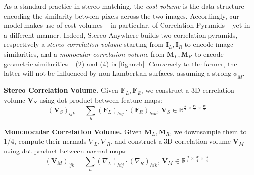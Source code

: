 \documentclass[10pt,twocolumn,letterpaper]{article}
\newcommand{\method}[0]{Stereo Anywhere\xspace}
\begin{document}
As a standard practice in stereo matching, the \textit{cost volume} is the data structure encoding the similarity between pixels across the two images. Accordingly, our model makes use of cost volumes -- in particular, of Correlation Pyramids \cite{lipson2021raft} -- yet in a different manner.
Indeed, \method builds two correlation pyramids, respectively a \textit{stereo correlation volume} starting from $\mathbf{I}_L, \mathbf{I}_R$ to encode image similarities, and a \textit{monocular correlation volume} from $\mathbf{M}_L, \mathbf{M}_R$ to encode geometric similarities -- (2) and (4) in \cref{fig:arch}.
Conversely to the former, the latter will not be influenced by non-Lambertian surfaces, assuming a strong $\phi_M$.

\textbf{Stereo Correlation Volume.} Given $\mathbf{F}_L, \mathbf{F}_R$, we construct a 3D correlation volume $\mathbf{V}_S$ using dot product between feature maps:
\begin{equation}
    (\mathbf{V}_S)_{ijk} = \sum_{h} (\mathbf{F}_L)_{hij} \cdot (\mathbf{F}_R)_{hik}, \ \mathbf{V}_S \in \mathbb{R}^{\frac{H}{4} \times \frac{W}{4} \times \frac{W}{4}}
    \label{eq:dot_corr}
\end{equation}

\textbf{Mononocular Correlation Volume.} Given $\mathbf{M}_L, \mathbf{M}_R$,
we downsample them to 1/4, compute their normals $\nabla_L, \nabla_R$,
and construct a 3D correlation volume $\mathbf{V}_M$ using dot product between normal maps:
\begin{equation}
    (\mathbf{V}_M)_{ijk} = \sum_{h} (\nabla_L)_{hij} \cdot (\nabla_R)_{hik}, \ \mathbf{V}_M \in \mathbb{R}^{\frac{H}{4} \times \frac{W}{4} \times \frac{W}{4}}
    \label{eq:dot_corr_mono}
\end{equation}
\end{document}

